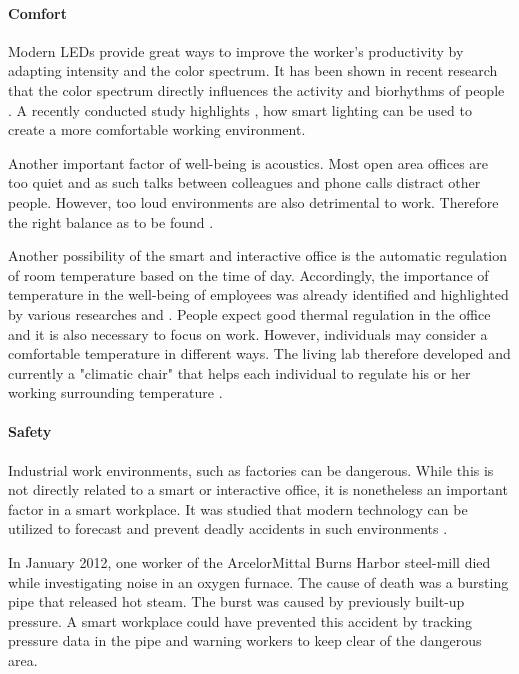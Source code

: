 \paragraph{Comfort}\label{sec:sda-comfort}
Modern LEDs provide great ways to improve the worker's productivity by adapting intensity and the 
color spectrum. It has been shown in recent research that the color spectrum directly influences the 
activity and biorhythms of people \cite{living-lab}. A recently conducted study highlights \cite{iotagenda}, how smart 
lighting can be used to create a more comfortable working environment.

Another important factor of well-being is acoustics. Most open area offices are too quiet and as 
such talks between colleagues and phone calls distract other people. However, too loud environments 
are also detrimental to work. Therefore the right balance as to be found \cite{living-lab}. 

Another possibility of the smart and interactive office is the automatic regulation of room 
temperature based on the time of day. Accordingly, the importance of temperature in the well-being of employees was already identified and highlighted by various researches \cite{iotagenda} and \cite{living-lab}. People expect good thermal regulation in 
the office and it is also necessary to focus on work. However, individuals may consider a comfortable temperature in different ways. The living lab therefore developed and currently a "climatic chair" that helps each 
individual to regulate his or her working surrounding temperature \cite{living-lab}.

\paragraph{Safety}\label{sec:sda-safety}
Industrial work environments, such as factories can be dangerous. While this is not directly related to a smart 
or interactive office, it is nonetheless an important factor in a smart workplace. 
It was studied that modern technology can be utilized to forecast and prevent deadly accidents in such environments \cite{sda-wired} .

In January 2012, one worker of the ArcelorMittal Burns Harbor steel-mill died while investigating 
noise in an oxygen furnace. The cause of death was a bursting pipe that released hot steam. The 
burst was caused by previously built-up pressure. A smart workplace could have prevented this 
accident by tracking pressure data in the pipe and warning workers to keep clear of the dangerous 
area. \cite{sda-wired} 

